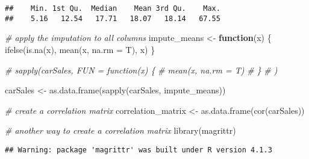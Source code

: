 \documentclass[
]{article}
\newenvironment{Shaded}{\begin{snugshade}}{\end{snugshade}}
\newcommand{\AttributeTok}[1]{\textcolor[rgb]{0.77,0.63,0.00}{#1}}
\newcommand{\CommentTok}[1]{\textcolor[rgb]{0.56,0.35,0.01}{\textit{#1}}}
\newcommand{\ControlFlowTok}[1]{\textcolor[rgb]{0.13,0.29,0.53}{\textbf{#1}}}
\newcommand{\DecValTok}[1]{\textcolor[rgb]{0.00,0.00,0.81}{#1}}
\newcommand{\FunctionTok}[1]{\textcolor[rgb]{0.00,0.00,0.00}{#1}}
\newcommand{\NormalTok}[1]{#1}
\newcommand{\OtherTok}[1]{\textcolor[rgb]{0.56,0.35,0.01}{#1}}
\newcommand{\SpecialCharTok}[1]{\textcolor[rgb]{0.00,0.00,0.00}{#1}}
\begin{document}
\begin{Shaded}
\end{Shaded}

\begin{verbatim}
##    Min. 1st Qu.  Median    Mean 3rd Qu.    Max. 
##    5.16   12.54   17.71   18.07   18.14   67.55
\end{verbatim}

\begin{Shaded}
\begin{Highlighting}[]
\CommentTok{\# apply the imputation to all columns}
\NormalTok{impute\_means }\OtherTok{\textless{}{-}} \ControlFlowTok{function}\NormalTok{(x) \{}
  \FunctionTok{ifelse}\NormalTok{(}\FunctionTok{is.na}\NormalTok{(x),}
       \FunctionTok{mean}\NormalTok{(x, }\AttributeTok{na.rm =}\NormalTok{ T), }
\NormalTok{       x)}
\NormalTok{\}}

\CommentTok{\# sapply(carSales, FUN = function(x) \{}
\CommentTok{\# mean(x, na.rm = T)}
\CommentTok{\# \}}
\CommentTok{\# )}

\NormalTok{carSales }\OtherTok{\textless{}{-}} \FunctionTok{as.data.frame}\NormalTok{(}\FunctionTok{sapply}\NormalTok{(carSales, impute\_means))}

\CommentTok{\# create a correlation matrix}
\NormalTok{correlation\_matrix }\OtherTok{\textless{}{-}} \FunctionTok{as.data.frame}\NormalTok{(}\FunctionTok{cor}\NormalTok{(carSales))}

\CommentTok{\# another way to create a correlation matrix}
\FunctionTok{library}\NormalTok{(magrittr)}
\end{Highlighting}
\end{Shaded}

\begin{verbatim}
## Warning: package 'magrittr' was built under R version 4.1.3
\end{verbatim}
\end{document}
